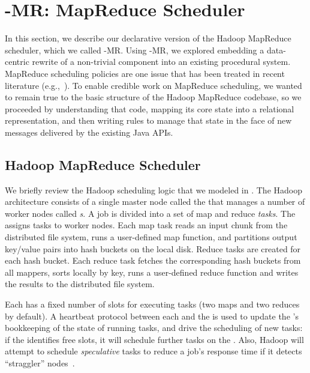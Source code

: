 \section{\BOOM-MR: MapReduce Scheduler}
\label{ch:boom:sec:port}

In this section, we describe our declarative version of the Hadoop MapReduce
scheduler, which we called \BOOM-MR.  Using \BOOM-MR, we explored embedding a
data-centric rewrite of a non-trivial component into an existing procedural
system.  MapReduce scheduling policies are one issue that has been treated in
recent literature (e.g.,~\cite{zaharia-late,delay-sched}).  To enable credible
work on MapReduce scheduling, we wanted to remain true to the basic structure
of the Hadoop MapReduce codebase, so we proceeded by understanding that code,
mapping its core state into a relational representation, and then writing
\OVERLOG rules to manage that state in the face of new messages delivered by
the existing Java APIs.

\subsection{Hadoop MapReduce Scheduler}
\label{ch:boom:sec:hadoop}

We briefly review the Hadoop scheduling logic that we modeled in \OVERLOG.  The
Hadoop architecture consists of a single master node called the {\em \JT} that
manages a number of worker nodes called {\em {\TT}s}.  A job is divided into a
set of map and reduce {\em tasks}.  The {\JT} assigns tasks to worker nodes.
Each map task reads an input chunk from the distributed file system, runs a
user-defined map function, and partitions output key/value pairs into hash
buckets on the local disk.  Reduce tasks are created for each hash bucket.
Each reduce task fetches the corresponding hash buckets from all mappers, sorts
locally by key, runs a user-defined reduce function and writes the results to
the distributed file system.

Each {\TT} has a fixed number of slots for executing tasks (two maps and two
reduces by default).  A heartbeat protocol between each {\TT} and the {\JT} is
used to update the {\JT}'s bookkeeping of the state of running tasks, and drive
the scheduling of new tasks: if the {\JT} identifies free {\TT} slots, it will
schedule further tasks on the {\TT}.  Also, Hadoop will attempt to schedule
{\em speculative} tasks to reduce a job's response time if it detects
``straggler'' nodes~\cite{mapreduce-osdi}.

